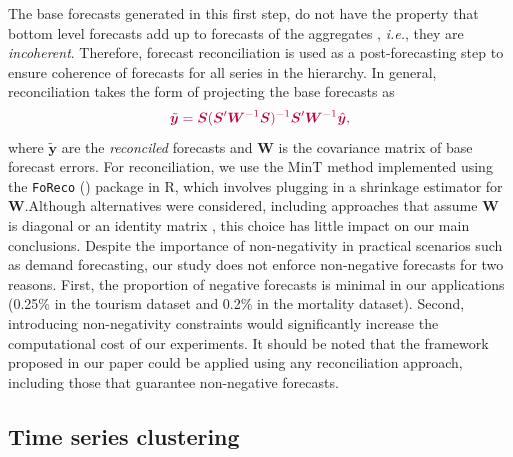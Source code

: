 \documentclass[a4paper,review,12pt,authoryear]{elsarticle}
\begin{document}
The base forecasts generated in this first step, do not have the property that bottom level forecasts add up to forecasts of the aggregates , \textit{i.e.}, they are \textit{incoherent}. Therefore, forecast reconciliation is used as a post-forecasting step to ensure coherence of forecasts for all series in the hierarchy. In general, reconciliation takes the form of projecting the base forecasts as
\vspace{-0.1in}
\[
  \color{purple}  \tilde{\boldsymbol{y}} = \boldsymbol{S}(\boldsymbol{S}'\boldsymbol{W}^{-1}\boldsymbol{S})^{-1}\boldsymbol{S}'\boldsymbol{W}^{-1}\hat{\boldsymbol{y}},
  \vspace{-0.15in}
\]
where $\tilde{\boldsymbol{y}}$ are the \textit{reconciled} forecasts and $\boldsymbol{W}$ is the covariance matrix of base forecast errors. {\color{purple}For reconciliation, we use the MinT method \citep{wickramasuriyaOptimalForecastReconciliation2019} implemented using the \texttt{FoReco} (\citealp{FoReco}) package in R, which involves plugging in a shrinkage estimator for $\boldsymbol{W}$.}Although alternatives were considered, including approaches that assume $\boldsymbol{W}$ is diagonal or an identity matrix \citep{hyndmanOptimalCombinationForecasts2011}, this choice has little impact on our main conclusions. {\color{purple}Despite the importance of non-negativity in practical scenarios such as demand forecasting, our study does not enforce non-negative forecasts for two reasons. First, the proportion of negative forecasts is minimal in our applications (0.25\% in the tourism dataset and 0.2\% in the mortality dataset). Second, introducing non-negativity constraints would significantly increase the computational cost of our experiments. It should be noted that the framework proposed in our paper could be applied using any reconciliation approach, including those that guarantee non-negative forecasts.} 


\subsection{Time series clustering} 
\label{sec:clustering}
\end{document}
